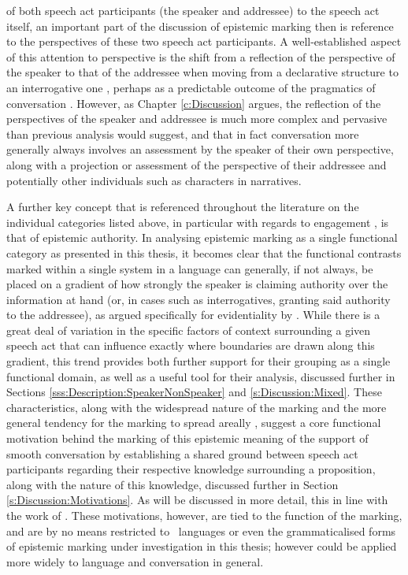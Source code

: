 of both speech act participants (the speaker and addressee) to the speech act itself, an important part of the discussion of epistemic marking then is reference to the perspectives of these two speech act participants. A well-established aspect of this attention to perspective is the shift from a reflection of the perspective of the speaker to that of the addressee when moving from a declarative structure to an interrogative one \cites[242]{Aikhenvald2004}{EgoIntro}, perhaps as a predictable outcome of the pragmatics of conversation \cite{Hill2020}. However, as Chapter \ref{c:Discussion} argues, the reflection of the perspectives of the speaker and addressee is much more complex and pervasive than previous analysis would suggest, and that in fact conversation more generally always involves an assessment by the speaker of their own perspective, along with a projection or assessment of the perspective of their addressee and potentially other individuals such as characters in narratives. 

A further key concept that is referenced throughout the literature on the individual categories listed above, in particular with regards to engagement \cite{EvansBergqvistSanRoque2018a}, is that of epistemic authority. In analysing epistemic marking as a single functional category as presented in this thesis, it becomes clear that the functional contrasts marked within a single system in a language can generally, if not always, be placed on a gradient of how strongly the speaker is claiming authority over the information at hand (or, in cases such as interrogatives, granting said authority to the addressee), as argued specifically for evidentiality by . While there is a great deal of variation in the specific factors of context surrounding a given speech act that can influence exactly where boundaries are drawn along this gradient, this trend provides both further support for their grouping as a single functional domain, as well as a useful tool for their analysis, discussed further in Sections \ref{sss:Description:SpeakerNonSpeaker} and \ref{s:Discussion:Mixed}. These characteristics, along with the widespread nature of the marking and the more general tendency for the marking to spread areally \cite{Aikhenvald2004}, suggest a core functional motivation behind the marking of this epistemic meaning of the support of smooth conversation by establishing a shared ground between speech act participants regarding their respective knowledge surrounding a proposition, along with the nature of this knowledge, discussed further in Section \ref{s:Discussion:Motivations}. As will be discussed in more detail, this in line with the work of . These motivations, however, are tied to the function of the marking, and are by no means restricted to \lfam\ languages or even the grammaticalised forms of epistemic marking under investigation in this thesis; however could be applied more widely to language and conversation in general.

